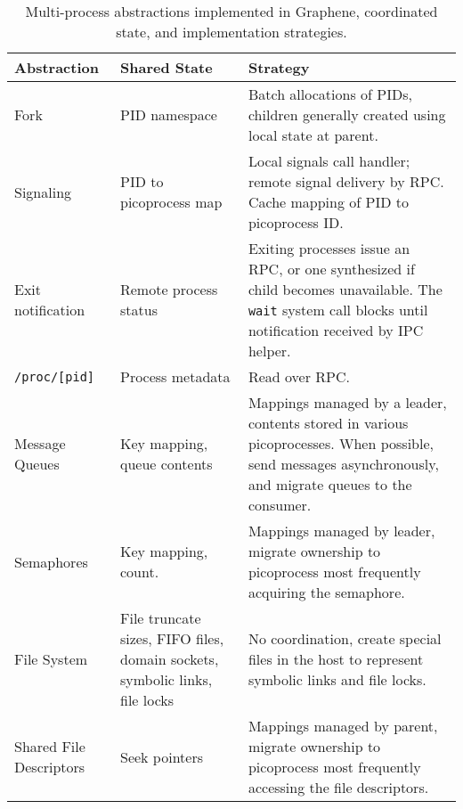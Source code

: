 \begin{table}
\footnotesize
\centering
\begin{tabular}{|l|p{0.9in}|p{2.9in}|}
\hline
{\bf Ab\-strac\-tion} & {\bf Shared State} & {\bf Strategy} \\
\hline
Fork & 
\raggedright
PID namespace & Batch allocations of PIDs, children generally created using local state at parent.  \\
\hline
Signaling & PID to picoprocess map & Local signals call handler; remote signal delivery by RPC.  Cache mapping of PID to picoprocess ID. \\
\hline
\raggedright
Exit notification & 
\raggedright
Remote process status  & Exiting processes issue an RPC, or one synthesized if child becomes unavailable.  The {\tt wait} system call blocks until notification received by IPC helper. \\
\hline
{\tt /proc/[pid]} & Process metadata & Read over RPC.  \\
\hline
Message Queues & 
\raggedright
Key mapping, queue contents & Mappings managed by a leader, contents stored in various picoprocesses.  When possible, send messages asynchronously, and migrate queues to the consumer.\\
\hline
Semaphores & 
\raggedright
Key mapping, count. & Mappings managed by leader, migrate ownership to picoprocess most frequently acquiring the semaphore. \\
\hline
\raggedright
File System & 
\raggedright
File truncate sizes, FIFO files, domain sockets, symbolic links, file locks & No coordination, create special files in the host to represent symbolic links and file locks. \\
\hline
\raggedright
Shared File Descriptors & 
\raggedright
Seek pointers & Mappings managed by parent, migrate ownership to picoprocess most frequently accessing the file descriptors. \\
\hline
\end{tabular}
\caption{Multi-process abstractions implemented in Graphene, coordinated state, and implementation strategies.}
\label{tab:multiproc}
\end{table}




